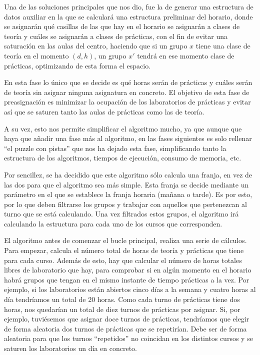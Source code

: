 Una de las soluciones principales que nos dio, fue la de generar una estructura de datos auxiliar en la que se calculará una estructura preliminar del horario, donde se asignarán qué casillas de las que hay en el horario se asignarán a clases de teoría y cuáles se asignarán a clases de prácticas, con el fin de evitar una saturación en las aulas del centro, haciendo que si un grupo $x$ tiene una clase de teoría en el momento $(d, h)$, un grupo $x'$ tendrá en ese momento clase de prácticas, optimizando de esta forma el espacio.

En esta fase lo único que se decide es qué horas serán de prácticas y cuáles serán de teoría sin asignar ninguna asignatura en concreto. El objetivo de esta fase de preasignación es minimizar la ocupación de los laboratorios de prácticas y evitar así que se saturen tanto las aulas de prácticas como las de teoría. 

A su vez, esto nos permite simplificar el algoritmo mucho, ya que aunque que haya que añadir una fase más al algoritmo, en las fases siguientes es solo rellenar ``el puzzle con pistas'' que nos ha dejado esta fase, simplificando tanto la estructura de los algoritmos, tiempos de ejecución, consumo de memoria, etc.

Por sencillez, se ha decidido que este algoritmo sólo calcula una franja, en vez de las dos para que el algoritmo sea más simple. Esta franja se decide mediante un parámetro en el que se establece la franja horaria (mañana o tarde). Es por esto, por lo que deben filtrarse los grupos y trabajar con aquellos que pertenezcan al turno que se está calculando. Una vez filtrados estos grupos, el algoritmo irá calculando la estructura para cada uno de los cursos que corresponden.


El algoritmo antes de comenzar el bucle principal, realiza una serie de cálculos. Para empezar, calcula el número total de horas de teoría y prácticas que tiene para cada curso. Además de esto, hay que calcular el número de horas totales libres de laboratorio que hay, para comprobar si en algún momento en el horario habrá grupos que tengan en el mismo instante de tiempo prácticas a la vez. Por ejemplo, si los laboratorios están abiertos cinco días a la semana y cuatro horas al día tendríamos un total de 20 horas. Como cada turno de prácticas tiene dos horas, nos quedarían un total de diez turnos de prácticas por asignar. Si, por ejemplo, tuviésemos que asignar doce turnos de prácticas, tendríamos que elegir de forma aleatoria dos turnos de prácticas que se repetirían. Debe ser de forma aleatoria para que los turnos ``repetidos'' no coincidan en los distintos cursos y se saturen los laboratorios un día en concreto.

